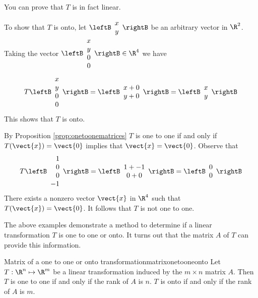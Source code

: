 \begin{solution} 
You can prove that $T$ is in fact linear. 

To show that $T$ is onto, let $\leftB \begin{array}{c} 
x \\
y
\end{array} \rightB$ be an arbitrary vector in $\R^2$. Taking the vector $\leftB \begin{array}{c}
x \\
y \\
0 \\
0 
\end{array} \rightB \in \R^4$ we have 
\[
T \leftB \begin{array}{c}
x \\
y \\
0 \\
0
\end{array}
\rightB = 
\leftB \begin{array}{c}
x + 0 \\
y + 0 
\end{array}
\rightB
= \leftB \begin{array}{c}
x \\
y 
\end{array}
\rightB
\]
This shows that $T$ is onto. 

By Proposition \ref{prop:onetoonematrices} $T$ is one to one if and only if $T(\vect{x}) = \vect{0}$ implies that $\vect{x} = \vect{0}$. Observe that 
\[
T \leftB \begin{array}{r}
1 \\
0 \\
0 \\
-1
\end{array}
\rightB = 
\leftB \begin{array}{c}
1 + -1 \\
0 + 0 
\end{array}
\rightB
= \leftB \begin{array}{c}
0 \\
0 
\end{array}
\rightB
\]
There exists a nonzero vector $\vect{x}$ in $\R^4$ such that $T(\vect{x}) = \vect{0}$. It follows that $T$ is not one to one.
\end{solution}

The above examples demonstrate a method to determine if a linear transformation $T$ is one to one or onto. It turns out that the matrix $A$ of $T$ can provide this information.

\begin{theorem}{Matrix of a one to one or onto transformation}{matrixonetooneonto}
Let $T: \R^n \mapsto \R^m$ be a linear transformation induced by the $m \times n$ matrix $A$. Then $T$ is one to one if and only if the rank of $A$ is $n$. $T$ is onto if and only if the rank of $A$ is $m$. 
\end{theorem}

